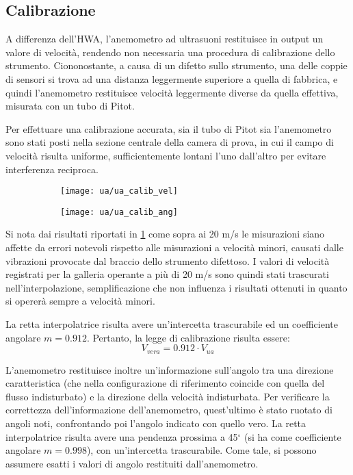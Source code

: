 \documentclass{article} %
\begin{document}
\subsection{Calibrazione}
A differenza dell'HWA, l'anemometro ad ultrasuoni restituisce in output un valore di velocità, rendendo non necessaria una procedura di calibrazione dello strumento. Ciononostante, a causa di un difetto sullo strumento, una delle coppie di sensori si trova ad una distanza leggermente superiore a quella di fabbrica, e quindi l'anemometro restituisce velocità leggermente diverse da quella effettiva, misurata con un tubo di Pitot.\par
Per effettuare una calibrazione accurata, sia il tubo di Pitot sia l'anemometro sono stati posti nella sezione centrale della camera di prova, in cui il campo di velocità risulta uniforme, sufficientemente lontani l'uno dall'altro per evitare interferenza reciproca.
\begin{figure}[ht!]
	\begin{subfigure}{0.5\textwidth}
		\texttt{[image: ua/ua\_calib\_vel]}
	\end{subfigure}
	\begin{subfigure}{0.5\textwidth}
		\texttt{[image: ua/ua\_calib\_ang]}
	\end{subfigure}
	\caption{}
	\label{fig:cal_ua}
\end{figure}\par
Si nota dai risultati riportati in \cref{fig:cal_ua} come sopra ai 20 m/s le misurazioni siano affette da errori notevoli rispetto alle misurazioni a velocità minori, causati dalle vibrazioni provocate dal braccio dello strumento difettoso. I valori di velocità registrati per la galleria operante a più di 20 m/s sono quindi stati trascurati nell'interpolazione, semplificazione che non influenza i risultati ottenuti in quanto si opererà sempre a velocità minori.\par
La retta interpolatrice risulta avere un'intercetta trascurabile ed un coefficiente angolare $m = 0.912$. Pertanto, la legge di calibrazione risulta essere:
\begin{displaymath}
	V_{vera} = 0.912\cdot V_{ua}
\end{displaymath}\par
L'anemometro restituisce inoltre un'informazione sull'angolo tra una direzione caratteristica (che nella configurazione di riferimento coincide con quella del flusso indisturbato) e la direzione della velocità indisturbata. Per verificare la correttezza dell'informazione dell'anemometro, quest'ultimo è stato ruotato di angoli noti, confrontando poi l'angolo indicato con quello vero.
La retta interpolatrice risulta avere una pendenza prossima a 45$^{\circ}$ (si ha come coefficiente angolare $m = 0.998$), con un'intercetta trascurabile. Come tale, si possono assumere esatti i valori di angolo restituiti dall'anemometro.
\end{document}

